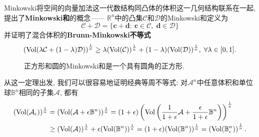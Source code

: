 Minkowski将空间的向量加法这一代数结构同凸体的体积这一几何结构联系在一起, 提出了\textbf{Minkowski和}的概念——
$\mathbb{R}^n$中的凸集$\mathcal{C}$和$\mathcal{D}$的Minkowski和定义为
\begin{equation*}
	\mathcal{C} + \mathcal{D} = \{\bm{c} + \bm{d} \colon\: \bm{c} \in \mathcal{C},\; \bm{d} \in \mathcal{D}\} 
\end{equation*}
并证明了混合体积的\textbf{Brunn-Minkowski不等式}
\begin{equation}\label{eq:BM1}
	\left( \operatorname{Vol}(\lambda \mathcal{C} + (1-\lambda) \mathcal{D})  \right)^{\frac1n}
	\geq \lambda (\operatorname{Vol}(\mathcal{C}))^{\frac1n} + (1-\lambda) (\operatorname{Vol}(\mathcal{D}))^{\frac1n},\;
	\forall \lambda \in [0,1]. 
\end{equation}
\begin{figure}[H]
	\centering
	\caption{正方形和圆的Minkowski和是一个具有圆角的正方形.}
\end{figure}
\noindent
从这一定理出发, 我们可以很容易地证明经典等周不等式: 对$\mathcal{A}^n$中任意体积和单位球$\mathbb{B}^n$相同的子集$\mathcal{A}$, 都有 
\begin{align*}
	(\operatorname{Vol}(\mathcal{A}_{\epsilon}))^{\frac1n}
	&= (\operatorname{Vol}(\mathcal{A} + \epsilon \mathbb{B}^n))^{\frac1n}
	= (1+\epsilon) \left(\operatorname{Vol}\left(\frac{1}{1+\epsilon} \mathcal{A} + \frac{\epsilon}{1+\epsilon} \mathbb{B}^n\right)\right)^{\frac1n} \\
	&\geq (\operatorname{Vol}(\mathcal{A}))^{\frac1n} + \epsilon (\operatorname{Vol}(\mathbb{B}^n))^{\frac1n} 
	= (1+\epsilon) (\operatorname{Vol}(\mathbb{B}^n))^{\frac1n} 
	= \left( \operatorname{Vol}(\mathbb{B}^n_{\epsilon}) \right)^{\frac1n}. 
\end{align*}

